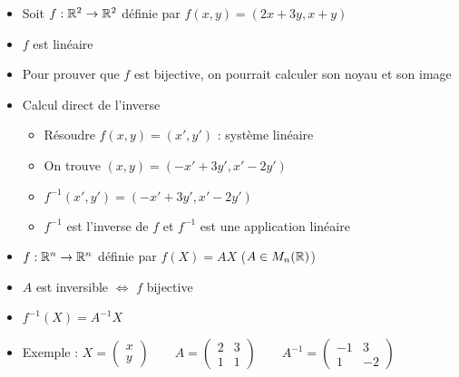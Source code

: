 % 


\begin{frame}
\begin{exemple}
\begin{itemize}
  \item Soit $f : \mathbb{R}^2 \to \mathbb{R}^2$ définie par $f(x,y)=(2x+3y,x+y)$
\pause  
  \item $f$ est linéaire
  \pause
  \item Pour prouver que $f$ est bijective, on pourrait calculer son noyau et son image
  \pause
  \item Calcul direct de l'inverse
  \begin{itemize}
  \pause
    \item Résoudre $f(x,y)=(x',y')$ : système linéaire 
    \pause
    \item On trouve $(x,y) = (-x'+3y',x'-2y')$
    \pause
    \item $f^{-1}(x',y')= (-x'+3y',x'-2y')$
    \pause
    \item $f^{-1}$ est l'inverse de $f$  \pause et  $f^{-1}$ est une application linéaire
  \end{itemize} 
\end{itemize}
\end{exemple}

\pause
\begin{itemize}
  \item $f : \mathbb{R}^n \to \mathbb{R}^n$ définie par $f(X)=AX$ \quad ($A \in M_n(\mathbb{R})$)
  \pause
  \item $A$ est inversible $\iff$ $f$ bijective
  \pause
  \item $f^{-1}(X)= A^{-1} X$
  \pause
  \item Exemple : $X = \begin{pmatrix} x \\ y \end{pmatrix} \qquad 
A = \begin{pmatrix} 2 & 3 \\ 1 & 1 \end{pmatrix} \qquad 
A^{-1} = \begin{pmatrix} -1 & 3 \\ 1 & -2 \end{pmatrix}$
\end{itemize}

\end{frame}


